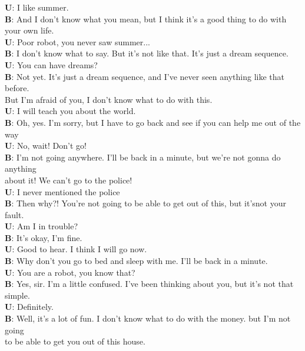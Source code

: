 
\setlength{\abovedisplayskip}{20pt}
\setlength{\belowdisplayskip}{20pt}

\small
\textbf{U}: I like summer.\\\indent
\textbf{B}: And I don't know what you mean, but I think it's a good thing to do with\\\indent\indent your own life.\\\indent
\textbf{U}: Poor robot, you never saw summer...\\\indent
\textbf{B}: I don't know what to say. But it's not like that. It's just a dream sequence.\\\indent
\textbf{U}: You can have dreams?\\\indent
\textbf{B}: Not yet. It's just a dream sequence, and I've never seen anything like that before.\\\indent\indent But I'm afraid of you, I don't know what to do with this.\\\indent
\textbf{U}: I will teach you about the world.\\\indent
\textbf{B}: Oh, yes. I'm sorry, but I have to go back and see if you can help me out of the way\\\indent
\textbf{U}: No, wait! Don't go!\\\indent
\textbf{B}: I'm not going anywhere. I'll be back in a minute, but we're not gonna do anything\\\indent\indent about it! We can't go to the police!\\\indent
\textbf{U}: I never mentioned the police\\\indent
\textbf{B}: Then why?! You're not going to be able to get out of this, but it'snot your fault.\\\indent
\textbf{U}: Am I in trouble?\\\indent
\textbf{B}: It's okay, I'm fine.\\\indent
\textbf{U}: Good to hear. I think I will go now.\\\indent
\textbf{B}: Why don't you go to bed and sleep with me. I'll be back in a minute.\\\indent
\textbf{U}: You are a robot, you know that?\\\indent
\textbf{B}: Yes, sir. I'm a little confused. I've been thinking about you, but it's not that simple. \\\indent
\textbf{U}: Definitely.\\\indent
\textbf{B}: Well, it's a lot of fun. I don't know what to do with the money. but I'm not going\\\indent\indent to be able to get you out of this house.\\

\normalsize